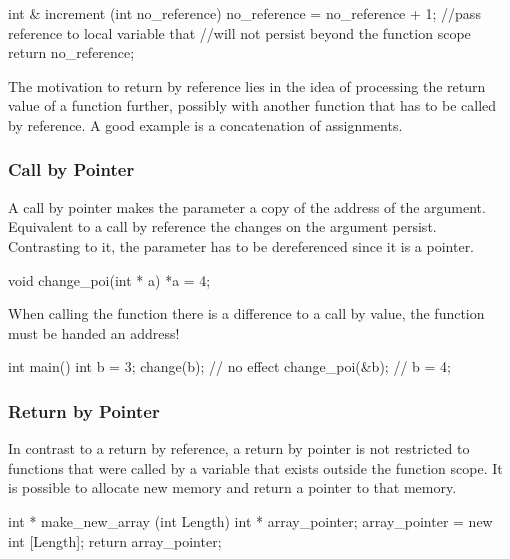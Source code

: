 \documentclass[10pt,a4paper]{scrartcl}
\begin{document}
\begin{multicols*}{2}
\begin{TPCpp}
int & increment (int no_reference){
	no_reference = no_reference + 1;
	//pass reference to local variable that 
	//will not persist beyond the function scope
	return no_reference;
}
\end{TPCpp}

The motivation to return by reference lies in the idea of processing the return value of a function further, possibly with another function that has to be called by reference. A good example is a concatenation of assignments.

\subsubsection{Call by Pointer}

A call by pointer makes the parameter a copy of the address of the argument. Equivalent to a call by reference the changes on the argument persist. Contrasting to it, the parameter has to be dereferenced since it is a pointer.

\begin{TPCpp}
void change_poi(int * a){
	*a = 4;
}
\end{TPCpp}

When calling the function there is a difference to a call by value, the function must be handed an address!

\begin{TPCpp}
int main(){
	int b = 3;
	change(b); // no effect
	change_poi(&b); // b = 4;
}
\end{TPCpp}

\subsubsection{Return by Pointer}

In contrast to a return by reference, a return by pointer is not restricted to functions that were called by a variable that exists outside the function scope. It is possible to allocate new memory and return a pointer to that memory.

\begin{TPCpp}
int * make_new_array (int Length){
	int * array_pointer;
	array_pointer = new int [Length];
	return array_pointer;
}
\end{TPCpp}

\subsubsection{}


\end{multicols*}
\end{document}
